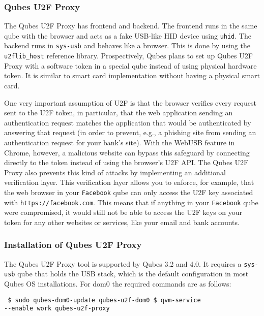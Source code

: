 \documentclass[runningheads,a4paper]{article}
\begin{document}
\subsubsection{Qubes U2F Proxy} 

The Qubes U2F Proxy has frontend and
backend. The frontend runs in the same qube with the browser and acts
as a fake USB-like HID device using \texttt{uhid}. The backend runs in
\texttt{sys-usb} and behaves like a browser. This is done by using the
\texttt{u2flib\_host} reference library. Prospectively, Qubes plans to
set up Qubes U2F Proxy with a software token in a special qube instead
of using physical hardware token. It is similar to smart card
implementation without having a physical smart card.

One very important assumption of U2F is that the browser verifies
every request sent to the U2F token, in particular, that the web
application sending an authentication request matches the application
that would be authenticated by answering that request (in order to
prevent, e.g., a phishing site from sending an authentication request
for your bank's site). With the WebUSB feature in Chrome, however, a
malicious website can bypass this safeguard by connecting directly to
the token instead of using the browser's U2F API.  The Qubes U2F
Proxy also prevents this kind of attacks by implementing an additional
verification layer. This verification layer allows you to enforce, for
example, that the web browser in your \texttt{Facebook} qube can only
access the U2F key associated with \texttt{https://facebook.com}. This
means that if anything in your \texttt{Facebook} qube were
compromised, it would still not be able to access the U2F keys on your
token for any other websites or services, like your email and bank
accounts.

\subsubsection{Installation of Qubes U2F Proxy} 

The Qubes U2F Proxy
tool is supported by Qubes 3.2 and 4.0. It requires a \texttt{sys-usb}
qube that holds the USB stack, which is the default configuration in
most Qubes OS installations. For dom0 the required commands are as
follows:
\begin{verbatim} $ sudo qubes-dom0-update qubes-u2f-dom0 $ qvm-service
--enable work qubes-u2f-proxy
\end{verbatim}
\end{document}
